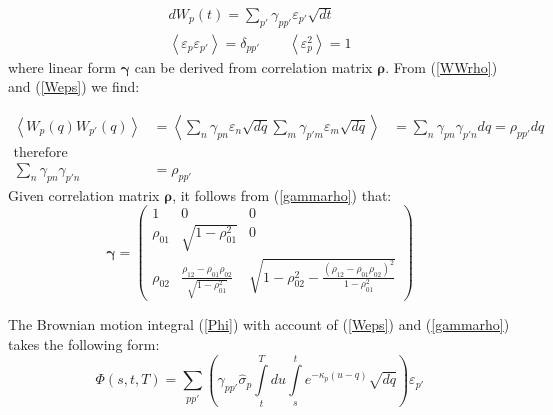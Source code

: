 \documentclass[10pt]{article}
\begin{document}
\begin{align}
\label{Weps}
dW_p(t)=\sum \limits_{p'} \gamma_{pp'}\varepsilon_{p'} \sqrt{dt} \\
\nonumber \left\langle \varepsilon_{p}  \varepsilon_{p'}\right\rangle = \delta_{pp'} \qquad  \left\langle \varepsilon_{p}^2 \right\rangle =1 
\end{align}
where linear form $\boldsymbol\gamma$ can be derived from correlation matrix $\boldsymbol\rho$. From (\ref{WWrho}) and (\ref{Weps}) we find:

\begin{align}
\label{gammarho}
\nonumber \left \langle W_{p}(q)W_{p'}(q) \right\rangle &= \left\langle \sum \limits_n \gamma_{pn} \varepsilon_n  \sqrt{dq} 
\sum \limits_m \gamma_{p'm}\varepsilon_m \sqrt{dq} \right\rangle&=\sum \limits_n \gamma_{pn} \gamma_{p'n} dq = \rho_{pp'} dq \\
\nonumber  \text{therefore} \\
\sum \limits_n \gamma_{pn} \gamma_{p'n} &= \rho_{pp'}
\end{align}
Given correlation matrix $\boldsymbol\rho$, it follows from  (\ref{gammarho}) that:
\begin{equation}
\label{gamma}
\boldsymbol\gamma =
\begin{pmatrix}
1 & 0 & 0 \\
\rho_{01} & \sqrt{1-\rho_{01}^2} & 0 \\
\rho_{02} & \frac{\rho_{12}-\rho_{01}\rho_{02} }{\sqrt{1-\rho_{01}^2}} & \sqrt{1-\rho_{02}^2-\frac{(\rho_{12}-\rho_{01}\rho_{02})^2}{1-\rho_{01}^2}}
\end{pmatrix}
\end{equation}

The Brownian motion integral (\ref{Phi}) with account of (\ref{Weps}) and (\ref{gammarho}) takes the following form:
\begin{equation}
\label{PhiEps}
\Phi (s,t,T)= \sum \limits_{pp'} \left(\gamma_{pp'} \hat {\sigma}_p \int \limits_t^T du \int \limits_s^t  e^{-\kappa_p (u-q)} \sqrt{dq} \right) \varepsilon_{p'} 
\end{equation}
\end{document}
